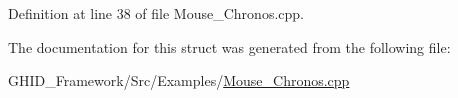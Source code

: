 \-Definition at line 38 of file \-Mouse\-\_\-\-Chronos.\-cpp.



\-The documentation for this struct was generated from the following file\-:\begin{DoxyCompactItemize}
\item 
\-G\-H\-I\-D\-\_\-\-Framework/\-Src/\-Examples/\hyperlink{_mouse___chronos_8cpp}{\-Mouse\-\_\-\-Chronos.\-cpp}\end{DoxyCompactItemize}
